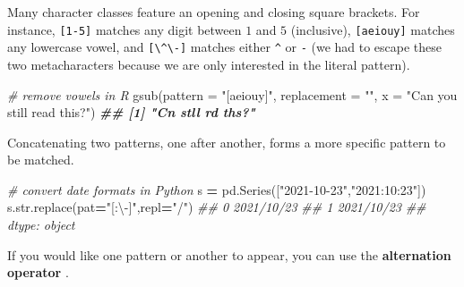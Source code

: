 \documentclass[
  12pt,
  krantz2]{krantz}
\makeatletter
\newenvironment{Shaded}{\begin{snugshade}}{\end{snugshade}}
\newcommand{\AttributeTok}[1]{\textcolor[rgb]{0.61,0.61,0.61}{#1}}
\newcommand{\BuiltInTok}[1]{#1}
\newcommand{\CommentTok}[1]{\textcolor[rgb]{0.37,0.37,0.37}{\textit{#1}}}
\newcommand{\DocumentationTok}[1]{\textcolor[rgb]{0.37,0.37,0.37}{\textbf{\textit{#1}}}}
\newcommand{\FunctionTok}[1]{\textcolor[rgb]{0,0,0}{#1}}
\newcommand{\NormalTok}[1]{#1}
\newcommand{\OperatorTok}[1]{\textcolor[rgb]{0.43,0.43,0.43}{\textbf{#1}}}
\newcommand{\StringTok}[1]{\textcolor[rgb]{0.5,0.5,0.5}{#1}}
\newenvironment{kframe}{%
\medskip{}
\setlength{\fboxsep}{.8em}
 \def\at@end@of@kframe{}%
 \ifinner\ifhmode%
  \def\at@end@of@kframe{\end{minipage}}%
  \begin{minipage}{\columnwidth}%
 \fi\fi%
 \def\FrameCommand##1{\hskip\@totalleftmargin \hskip-\fboxsep
 \colorbox{shadecolor}{##1}\hskip-\fboxsep
     \hskip-\linewidth \hskip-\@totalleftmargin \hskip\columnwidth}%
 \MakeFramed {\advance\hsize-\width
   \@totalleftmargin\z@ \linewidth\hsize
   \@setminipage}}%
 {\par\unskip\endMakeFramed%
 \at@end@of@kframe}
\renewenvironment{Shaded}{\begin{kframe}}{\end{kframe}}
\makeatother
\begin{document}
\begin{Shaded}
\end{Shaded}

Many character classes feature an opening and closing square brackets. For instance, \texttt{{[}1-5{]}} matches any digit between \(1\) and \(5\) (inclusive), \texttt{{[}aeiouy{]}} matches any lowercase vowel, and \texttt{{[}\textbackslash{}\^{}\textbackslash{}-{]}} matches either \texttt{\^{}} or \texttt{-} (we had to escape these two metacharacters because we are only interested in the literal pattern).

\begin{Shaded}
\begin{Highlighting}[]
\CommentTok{\# remove vowels in R}
\FunctionTok{gsub}\NormalTok{(}\AttributeTok{pattern =} \StringTok{"[aeiouy]"}\NormalTok{, }\AttributeTok{replacement =} \StringTok{""}\NormalTok{, }
     \AttributeTok{x =} \StringTok{"Can you still read this?"}\NormalTok{)}
\DocumentationTok{\#\# [1] "Cn  stll rd ths?"}
\end{Highlighting}
\end{Shaded}

Concatenating two patterns, one after another, forms a more specific pattern to be matched.

\begin{Shaded}
\begin{Highlighting}[]
\CommentTok{\# convert date formats in Python}
\NormalTok{s }\OperatorTok{=}\NormalTok{ pd.Series([}\StringTok{"2021{-}10{-}23"}\NormalTok{,}\StringTok{"2021:10:23"}\NormalTok{])}
\NormalTok{s.}\BuiltInTok{str}\NormalTok{.replace(pat}\OperatorTok{=}\StringTok{"[:\textbackslash{}{-}]"}\NormalTok{,repl}\OperatorTok{=}\StringTok{"/"}\NormalTok{)}
\CommentTok{\#\# 0    2021/10/23}
\CommentTok{\#\# 1    2021/10/23}
\CommentTok{\#\# dtype: object}
\end{Highlighting}
\end{Shaded}

If you would like one pattern or another to appear, you can use the \textbf{alternation operator} \texttt{\textbar{}}.
\end{document}
